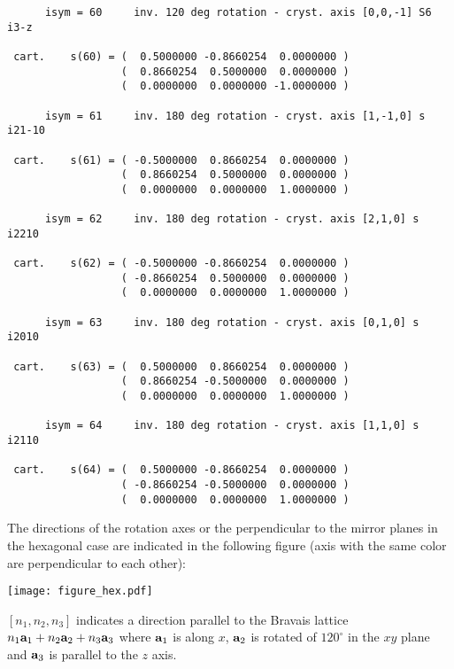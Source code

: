 \documentclass[12pt,a4paper]{article}
\begin{document}
\begin{footnotesize}
\begin{verbatim}
      isym = 60     inv. 120 deg rotation - cryst. axis [0,0,-1] S6    i3-z

 cart.    s(60) = (  0.5000000 -0.8660254  0.0000000 )
                  (  0.8660254  0.5000000  0.0000000 )
                  (  0.0000000  0.0000000 -1.0000000 )

      isym = 61     inv. 180 deg rotation - cryst. axis [1,-1,0] s     i21-10

 cart.    s(61) = ( -0.5000000  0.8660254  0.0000000 )
                  (  0.8660254  0.5000000  0.0000000 )
                  (  0.0000000  0.0000000  1.0000000 )

      isym = 62     inv. 180 deg rotation - cryst. axis [2,1,0] s      i2210

 cart.    s(62) = ( -0.5000000 -0.8660254  0.0000000 )
                  ( -0.8660254  0.5000000  0.0000000 )
                  (  0.0000000  0.0000000  1.0000000 )

      isym = 63     inv. 180 deg rotation - cryst. axis [0,1,0] s      i2010

 cart.    s(63) = (  0.5000000  0.8660254  0.0000000 )
                  (  0.8660254 -0.5000000  0.0000000 )
                  (  0.0000000  0.0000000  1.0000000 )

      isym = 64     inv. 180 deg rotation - cryst. axis [1,1,0] s      i2110

 cart.    s(64) = (  0.5000000 -0.8660254  0.0000000 )
                  ( -0.8660254 -0.5000000  0.0000000 )
                  (  0.0000000  0.0000000  1.0000000 )

\end{verbatim}
\end{footnotesize}
The directions of the rotation axes or the perpendicular to the mirror
planes in the hexagonal case are indicated in the following figure
(axis with the same color are perpendicular to each other):
\begin{center}
\texttt{[image: figure\_hex.pdf]} 
\end{center}
$[n_1,n_2,n_3]$ indicates a direction parallel
to the Bravais lattice $n_1 {\bf a}_1 + n_2 {\bf a}_2 + n_3 {\bf a}_3$
where ${\bf a}_1$ is along $x$, ${\bf a}_2$ is rotated 
of $120^\circ$ in the $xy$ plane and ${\bf a}_3$ is parallel to the $z$
axis.
\end{document}
